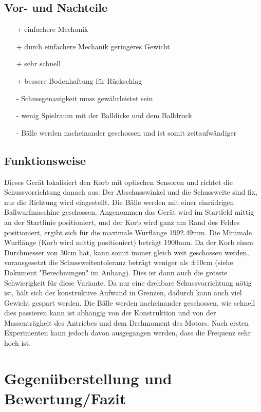 \begin{landscape}
\subsection{Vor- und Nachteile}
\begin{minipage}{\textwidth}
    \begin{itemize}
        \item[+] einfachere Mechanik
        \item[+] durch einfachere Mechanik geringeres Gewicht
        \item[+] sehr schnell
        \item[+] bessere Bodenhaftung für Rückschlag 
        \item[-] Schussgenauigkeit muss gewährleistet sein
        \item[-] wenig Spielraum mit der Balldicke und dem Balldruck
        \item[-] Bälle werden nacheinander geschossen und ist somit zeitaufwändiger
    \end{itemize}
\end{minipage}

\subsection{Funktionsweise}
Dieses Gerät lokalisiert den Korb mit optischen Sensoren und richtet die Schussvorrichtung danach aus. Der Abschusswinkel und die Schussweite sind fix, nur die Richtung wird eingestellt. Die Bälle werden mit einer einrädrigen Ballwurfmaschine geschossen. Angenommen das Gerät wird im Startfeld mittig an der Startlinie positioniert, und der Korb wird ganz am Rand des Feldes positioniert, ergibt sich für die maximale Wurflänge 1992.49mm. Die Minimale Wurflänge (Korb wird mittig positioniert) beträgt 1900mm. Da der Korb einen Durchmesser von 30cm hat, kann somit immer gleich weit geschossen werden, vorausgesetzt die Schussweitentoleranz beträgt weniger als ±10cm (siehe Dokument "Berechnungen" im Anhang). Dies ist dann auch die grösste Schwierigkeit für diese Variante. Da nur eine drehbare Schussvorrichtung nötig ist, hält sich der konstruktive Aufwand in Grenzen, dadurch kann auch viel Gewicht gespart werden. Die Bälle werden nacheinander geschossen, wie schnell dies passieren kann ist abhängig von der Konstruktion und von der Massenträgheit des Antriebes und dem Drehmoment des Motors. Nach ersten Experimenten kann jedoch davon ausgegangen werden, dass die Frequenz sehr hoch ist.

\section{Gegenüberstellung und Bewertung/Fazit}


\end{landscape}
